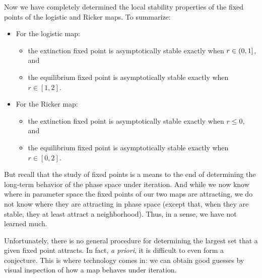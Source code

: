 \documentclass{article}
\theoremstyle{plain}
\theoremstyle{definition}
\DeclarePairedDelimiter{\lhalfopenproto}{\lparen}{\rbrack}
\newcommand{\lhalfopen}{\lhalfopenproto*}
\begin{document}
Now we have completely determined the local stability properties of the fixed points of the logistic and Ricker maps. To summarize:
\begin{itemize}
\item For the logistic map:
  \begin{itemize}
  \item the extinction fixed point is asymptotically stable exactly when \(r \in \lhalfopen{0, 1}\), and
  \item the equilibrium fixed point is asymptotically stable exactly when \(r \in [1, 2]\).
  \end{itemize}
\item For the Ricker map:
  \begin{itemize}
  \item the extinction fixed point is asymptotically stable exactly when \(r \le 0\), and
  \item the equilibrium fixed point is asymptotically stable exactly when \(r \in [0, 2]\).
  \end{itemize}
\end{itemize}
But recall that the study of fixed points is a means to the end of determining the long-term behavior of the phase space under iteration. And while we now know where in parameter space the fixed points of our two maps are attracting, we do not know where they are attracting in phase space (except that, when they are stable, they at least attract a neighborhood). Thus, in a sense, we have not learned much.

Unfortunately, there is no general procedure for determining the largest set that a given fixed point attracts. In fact, \emph{a priori}, it is difficult to even form a conjecture. This is where technology comes in: we can obtain good guesses by visual inspection of how a map behaves under iteration.

\end{document}
